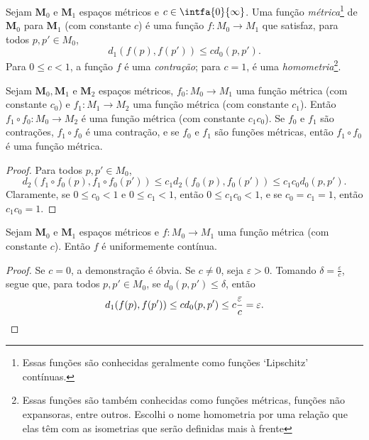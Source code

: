 \begin{defi}
Sejam $\bm M_0$ e $\bm M_1$ espaços métricos e $c \in \intfa{0}{\infty}$. Uma função \emph{métrica}\footnote{Essas funções são conhecidas geralmente como funções `Lipschitz' contínuas.} de $\bm M_0$ para $\bm M_1$ (com constante $c$) é uma função $f\colon M_0 \to M_1$ que satisfaz, para todos $p,p' \in M_0$,
	\begin{equation*}
	d_1(f(p),f(p')) \leq cd_0(p,p').
	\end{equation*}
Para $0 \leq c < 1$, a função $f$ é uma \emph{contração}; para $c=1$, é uma \emph{homometria}\footnote{Essas funções são também conhecidas como funções métricas, funções não expansoras, entre outros. Escolhi o nome homometria por uma relação que elas têm com as isometrias que serão definidas mais à frente}.
\end{defi}

\begin{prop}
Sejam $\bm M_0, \bm M_1$ e $\bm M_2$ espaços métricos, $f_0\colon M_0 \to M_1$ uma função métrica (com constante $c_0$) e $f_1\colon M_1 \to M_2$ uma função métrica (com constante $c_1$). Então $f_1 \circ f_0\colon M_0 \to M_2$ é uma função métrica (com constante $c_1c_0$). Se $f_0$ e $f_1$ são contrações, $f_1 \circ f_0$ é uma contração, e se $f_0$ e $f_1$ são funções métricas, então $f_1 \circ f_0$ é uma função métrica.
\end{prop}
\begin{proof}
Para todos $p,p' \in M_0$,
	\begin{equation*}
	d_2(f_1 \circ f_0(p),f_1 \circ f_0(p')) \leq c_1d_2(f_0(p),f_0(p')) \leq c_1c_0d_0(p,p').
	\end{equation*}
Claramente, se $0 \leq c_0 < 1$ e $0 \leq c_1 < 1$, então $0 \leq c_1c_0 < 1$, e se $c_0=c_1=1$, então $c_1c_0=1$.
\end{proof}

\begin{prop}
Sejam $\bm M_0$ e $\bm M_1$ espaços métricos e $f\colon M_0 \to M_1$ uma função métrica (com constante $c$). Então $f$ é uniformemente contínua.
\end{prop}
\begin{proof}
Se $c=0$, a demonstração é óbvia. Se $c \neq 0$, seja $\varepsilon>0$. Tomando $\delta=\frac{\varepsilon}{c}$, segue que, para todos $p,p' \in M_0$, se $d_0(p,p') \leq \delta$, então
	\begin{equation*}
	d_1(f(p),f(p')) \leq cd_0(p,p') \leq c\frac{\varepsilon}{c}=\varepsilon. \qedhere
	\end{equation*}
\end{proof}

